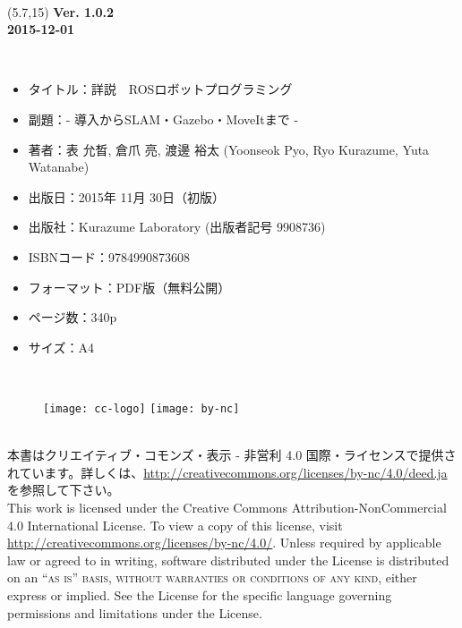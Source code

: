 \documentclass[11pt,fleqn]{book} %
\begin{document}
\begingroup
\thispagestyle{empty}

\centering
~\vfill
\begin{textblock}{5}(5.7,15)
{\Large{\textbf{Ver. 1.0.2\\2015-12-01}}}
\end{textblock}
\endgroup

\newpage
\thispagestyle{empty}

\noindent{\LARGE [本の紹介]}\\
\normalsize
\begin{itemize}[leftmargin=*]
\item タイトル：詳説　ROSロボットプログラミング
\item 副題：- 導入からSLAM・Gazebo・MoveItまで -
\item 著者：表 允晳, 倉爪 亮, 渡邊 裕太 (Yoonseok Pyo, Ryo Kurazume, Yuta Watanabe)
\item 出版日：2015年 11月 30日（初版）
\item 出版社：Kurazume Laboratory (出版者記号 9908736)
\item ISBNコード：9784990873608
\item フォーマット：PDF版（無料公開）
\item ページ数：340p
\item サイズ：A4
\end{itemize}
\vspace*{1cm}


\noindent{\LARGE [ライセンス]}\\
\begin{figure}[htp]
\centering
\texttt{[image: cc-logo]}
\hspace{10pt}
\texttt{[image: by-nc]}
\end{figure}
\normalsize\\
\noindent 本書はクリエイティブ・コモンズ・表示 - 非営利 4.0 国際・ライセンスで提供されています。詳しくは、\url{http://creativecommons.org/licenses/by-nc/4.0/deed.ja} を参照して下さい。\\

\noindent This work is licensed under the Creative Commons Attribution-NonCommercial 4.0 International License. To view a copy of this license, visit \url{http://creativecommons.org/licenses/by-nc/4.0/}. Unless required by applicable law or agreed to in writing, software distributed under the License is distributed on an \textsc{``as is'' basis, without warranties or conditions of any kind}, either express or implied. See the License for the specific language governing permissions and limitations under the License.\\ %
\end{document}
